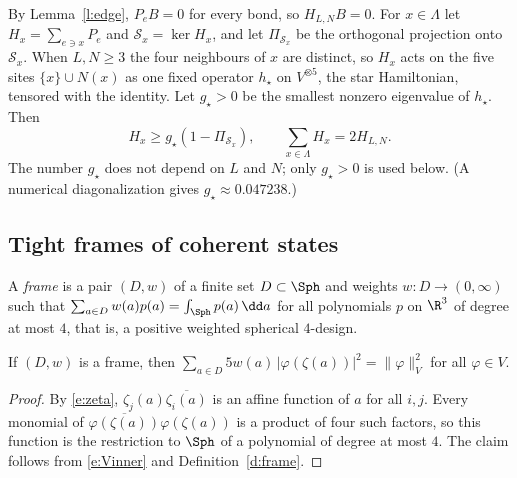 By Lemma~\ref{l:edge}, $P_e B = 0$ for every bond, so $H_{L, N} B = 0$. For $x \in \Lambda$ let $H_x = \sum_{e \ni x} P_e$ and $\mathcal S_x = \ker H_x$, and let $\Pi_{\mathcal S_x}$ be the orthogonal projection onto $\mathcal S_x$. When $L, N \ge 3$ the four neighbours of $x$ are distinct, so $H_x$ acts on the five sites $\{x\} \cup N(x)$ as one fixed operator $h_\star$ on $V^{\otimes 5}$, the star Hamiltonian, tensored with the identity. Let $g_\star > 0$ be the smallest nonzero eigenvalue of $h_\star$. Then
\begin{equation}\label{e:star}
H_x \ge g_\star (1 - \Pi_{\mathcal S_x}), \qquad \sum_{x \in \Lambda} H_x = 2 H_{L, N} .
\end{equation}
The number $g_\star$ does not depend on $L$ and $N$; only $g_\star > 0$ is used below. (A numerical diagonalization gives $g_\star \approx 0.047238$.)

\subsection{Tight frames of coherent states}\label{s:tight}

\begin{definition}\label{d:frame}
A \emph{frame} is a pair $(D, w)$ of a finite set $D \subset \Sph$ and weights $w \colon D \to (0, \infty)$ such that $\sum_{a \in D} w(a) p(a) = \int_{\Sph} p(a) \, \dd a$ for all polynomials $p$ on $\R^3$ of degree at most $4$, that is, a positive weighted spherical $4$-design.
\end{definition}

\begin{lemma}\label{l:tight}
If $(D, w)$ is a frame, then $\sum_{a \in D} 5 w(a) \, |\varphi(\zeta(a))|^2 = \|\varphi\|_V^2$ for all $\varphi \in V$.
\end{lemma}

\begin{proof}
By \eqref{e:zeta}, $\zeta_j(a) \overline{\zeta_i(a)}$ is an affine function of $a$ for all $i, j$. Every monomial of $\overline{\varphi(\zeta(a))} \varphi(\zeta(a))$ is a product of four such factors, so this function is the restriction to $\Sph$ of a polynomial of degree at most $4$. The claim follows from \eqref{e:Vinner} and Definition~\ref{d:frame}.
\end{proof}

